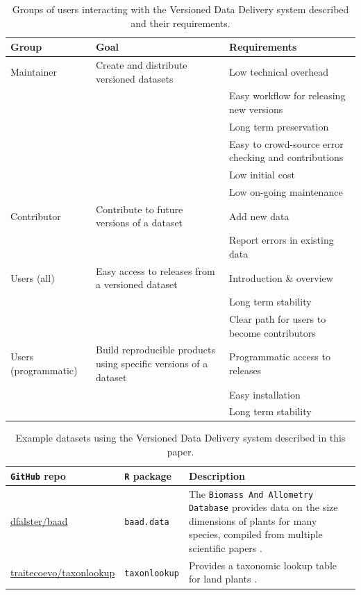 \documentclass[a4paper,11pt]{article}
\newcommand{\ghsmurl}[1]{{\footnotesize\href{https://github.com/#1}{#1}}}
\begin{document}
\begin{table}[h!]
\centering
\caption{Groups of users interacting with the Versioned Data Delivery system described and their requirements.}
{\footnotesize
\vspace{1cm}
  \begin{tabular}{p{2cm}p{5cm}p{7cm}}
  \hline
  \textbf{Group} & \textbf{Goal} & \textbf{Requirements} \\ \hline
  Maintainer & Create and distribute versioned datasets & Low technical overhead \\
    & & Easy workflow for releasing new versions \\
    & & Long term preservation \\
    & & Easy to crowd-source error checking and contributions \\
    & & Low initial cost \\
    & & Low on-going maintenance \\
  Contributor & Contribute to future versions of a dataset & Add new data \\
    & & Report errors in existing data \\
  Users (all) & Easy access to releases from a versioned dataset & Introduction \& overview \\
    & & Long term stability \\
    & & Clear path for users to become contributors \\
  Users (programmatic) & Build reproducible products using specific versions of a dataset & Programmatic access to releases \\
    & & Easy installation \\
    & & Long term stability \\
  \hline
  \end{tabular}
}
\label{tab:user_requirements}
\end{table}

\newpage

\begin{table}[h!]
\centering
\caption{Example datasets using the Versioned Data Delivery system described in this paper.}
{\footnotesize
\vspace{1cm}

  \begin{tabular}{p{3.5cm}p{3cm}p{7cm}}
  \hline
   \textbf{\texttt{GitHub} repo} & \textbf{\texttt{R} package} & \textbf{Description} \\ \hline
  \ghsmurl{dfalster/baad} & \texttt{baad.data} & The \texttt{Biomass And Allometry Database} provides data on the size dimensions of plants for many species, compiled from multiple scientific papers \citep{Falster-2015}.\\
  \ghsmurl{traitecoevo/taxonlookup} & \texttt{taxonlookup} & Provides a taxonomic lookup table for land plants \citep{Pennell-2015a}.\\
  \hline
  \end{tabular}
  }
\label{tab:examples}
\end{table}
\end{document}
